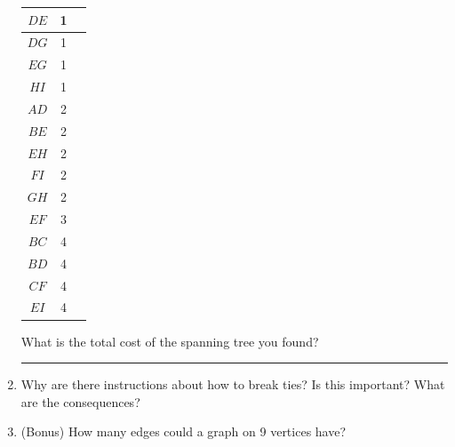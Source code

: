 \documentclass[12pt]{article}
\newcommand{\ans}[1][1in]{\rule{#1}{.5pt}}
\begin{document}
\begin{enumerate}
\begin{adjustbox}{valign=t,minipage={.1\linewidth}}
\begin{tabular}{ c | c |  c}
$DE$ & 1 &\\
\hline

$DG$ & 1&\\
\hline

$EG$ & 1&\\
\hline

$HI$ & 1 &\\
\hline

$AD$ & 2 &\\
\hline

$BE$ & 2 &\\
\hline
 
$EH$ & 2&\\
\hline

$FI$ & 2&\\
\hline

$GH$ & 2&\\
\hline

$EF$ & 3&\\
\hline

$BC$ & 4 &\\
\hline

$BD$ & 4 &\\
\hline
 
$CF$ & 4&\\
\hline

$EI$ & 4 \\

 \end{tabular}
 \end{adjustbox}
 \hfill

 
\vspace{1cm}

 
 What is the total cost of the spanning tree you found? \ans
 \item Why are there instructions about how to break ties? Is this important? What are the consequences?
 \vfill
 \item (Bonus) How many edges could a graph on 9 vertices have?
\end{enumerate}
\end{document}
